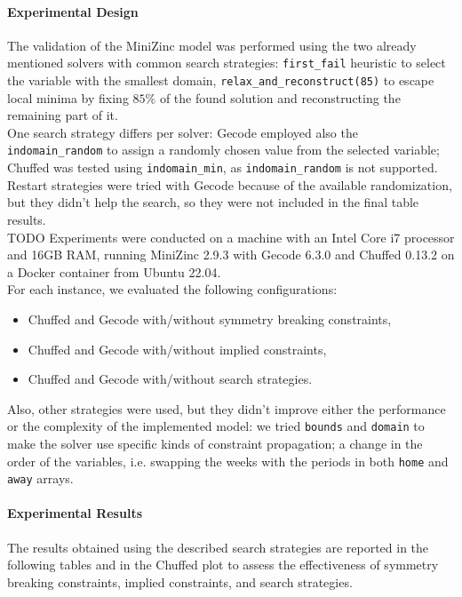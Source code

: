 \documentclass[11pt]{article}
\begin{document}
\paragraph{Experimental Design}
The validation of the MiniZinc model was performed using the two already mentioned solvers with common search strategies: \texttt{first\_fail} heuristic to select the variable with the smallest domain, \texttt{relax\_and\_reconstruct(85)} to escape local minima by fixing $85\%$ of the found solution and reconstructing the remaining part of it. \\One search strategy differs per solver: Gecode employed also the \texttt{indomain\_random} to assign a randomly chosen value from the selected variable; Chuffed was tested using \texttt{indomain\_min}, as \texttt{indomain\_random} is not supported. \\
Restart strategies were tried with Gecode because of the available randomization, but they didn't help the search, so they were not included in the final table results.\\
TODO Experiments were conducted on a machine with an Intel Core i7 processor and 16GB RAM, running MiniZinc 2.9.3 with Gecode 6.3.0 and Chuffed 0.13.2 on a Docker container from Ubuntu 22.04.\\
For each instance, we evaluated the following configurations:
\begin{itemize}
    \item Chuffed and Gecode with/without symmetry breaking constraints,
    \item Chuffed and Gecode with/without implied constraints,
    \item Chuffed and Gecode with/without search strategies.
\end{itemize} 
Also, other strategies were used, but they didn't improve either the performance or the complexity of the implemented model: we tried \texttt{bounds} and \texttt{domain} to make the solver use specific kinds of constraint propagation; a change in the order of the variables, i.e. swapping the weeks with the periods in both \texttt{home} and \texttt{away} arrays.

\paragraph{Experimental Results}

The results obtained using the described search strategies are reported in the following tables and in the Chuffed plot to assess the effectiveness of symmetry breaking constraints, implied constraints, and search strategies.
\end{document}
